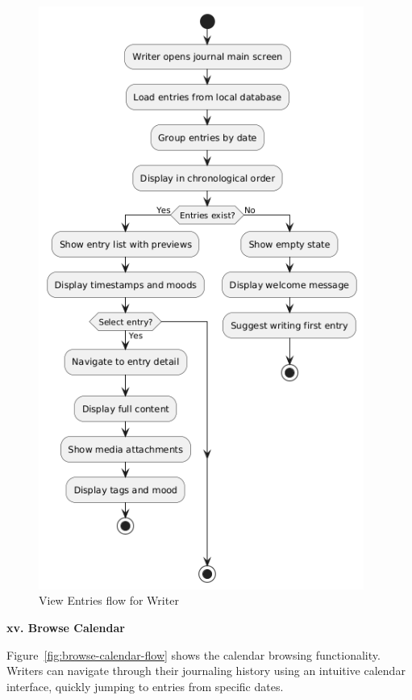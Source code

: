 \begin{figure}[H]
\centering
\includegraphics[width=0.95\textwidth,height=0.7\textheight,keepaspectratio]{files/imgs/view_entries_flow.png}
\caption{View Entries flow for Writer}
\label{fig:view-entries-flow}
\end{figure}
\clearpage

\textbf{xv. Browse Calendar}

Figure~\ref{fig:browse-calendar-flow} shows the calendar browsing functionality. Writers can navigate through their journaling history using an intuitive calendar interface, quickly jumping to entries from specific dates.


